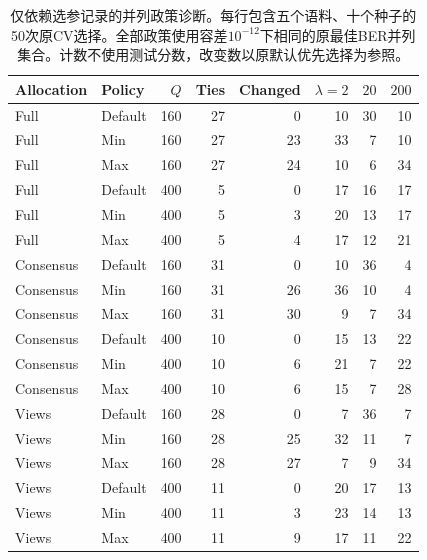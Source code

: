 \begin{table}[htbp]
\centering\small
\caption{仅依赖选参记录的并列政策诊断。每行包含五个语料、十个种子的50次原CV选择。全部政策使用容差$10^{-12}$下相同的原最佳BER并列集合。计数不使用测试分数，改变数以原默认优先选择为参照。}\label{tab:tie-policy-selection-counts}
\begin{tabular}{llrrrrrr}\toprule
Allocation & Policy & $Q$ & Ties & Changed & $\lambda=2$ & $20$ & $200$\\\midrule
Full & Default & 160 & 27 & 0 & 10 & 30 & 10\\
Full & Min & 160 & 27 & 23 & 33 & 7 & 10\\
Full & Max & 160 & 27 & 24 & 10 & 6 & 34\\
Full & Default & 400 & 5 & 0 & 17 & 16 & 17\\
Full & Min & 400 & 5 & 3 & 20 & 13 & 17\\
Full & Max & 400 & 5 & 4 & 17 & 12 & 21\\
Consensus & Default & 160 & 31 & 0 & 10 & 36 & 4\\
Consensus & Min & 160 & 31 & 26 & 36 & 10 & 4\\
Consensus & Max & 160 & 31 & 30 & 9 & 7 & 34\\
Consensus & Default & 400 & 10 & 0 & 15 & 13 & 22\\
Consensus & Min & 400 & 10 & 6 & 21 & 7 & 22\\
Consensus & Max & 400 & 10 & 6 & 15 & 7 & 28\\
Views & Default & 160 & 28 & 0 & 7 & 36 & 7\\
Views & Min & 160 & 28 & 25 & 32 & 11 & 7\\
Views & Max & 160 & 28 & 27 & 7 & 9 & 34\\
Views & Default & 400 & 11 & 0 & 20 & 17 & 13\\
Views & Min & 400 & 11 & 3 & 23 & 14 & 13\\
Views & Max & 400 & 11 & 9 & 17 & 11 & 22\\
\bottomrule\end{tabular}
\end{table}
